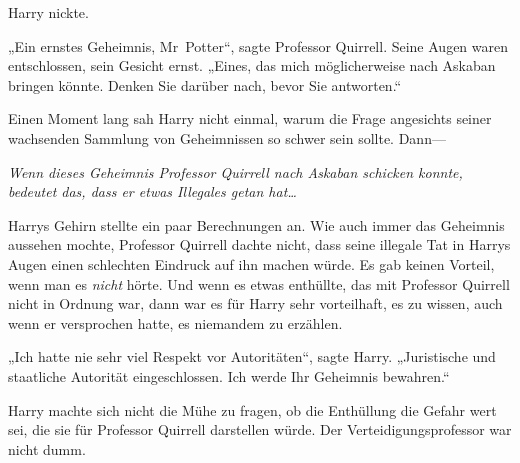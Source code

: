 Harry nickte.

„Ein ernstes Geheimnis, Mr~Potter“, sagte Professor Quirrell. Seine Augen waren entschlossen, sein Gesicht ernst. „Eines, das mich möglicherweise nach Askaban bringen könnte. Denken Sie darüber nach, bevor Sie antworten.“

Einen Moment lang sah Harry nicht einmal, warum die Frage angesichts seiner wachsenden Sammlung von Geheimnissen so schwer sein sollte. Dann—

\emph{Wenn dieses Geheimnis Professor Quirrell nach Askaban schicken konnte, bedeutet das, dass er etwas Illegales getan hat…}

Harrys Gehirn stellte ein paar Berechnungen an. Wie auch immer das Geheimnis aussehen mochte, Professor Quirrell dachte nicht, dass seine illegale Tat in Harrys Augen einen schlechten Eindruck auf ihn machen würde. Es gab keinen Vorteil, wenn man es \emph{nicht} hörte. Und wenn es etwas enthüllte, das mit Professor Quirrell nicht in Ordnung war, dann war es für Harry sehr vorteilhaft, es zu wissen, auch wenn er versprochen hatte, es niemandem zu erzählen.

„Ich hatte nie sehr viel Respekt vor Autoritäten“, sagte Harry. „Juristische und staatliche Autorität eingeschlossen. Ich werde Ihr Geheimnis bewahren.“

Harry machte sich nicht die Mühe zu fragen, ob die Enthüllung die Gefahr wert sei, die sie für Professor Quirrell darstellen würde. Der Verteidigungsprofessor war nicht dumm.

